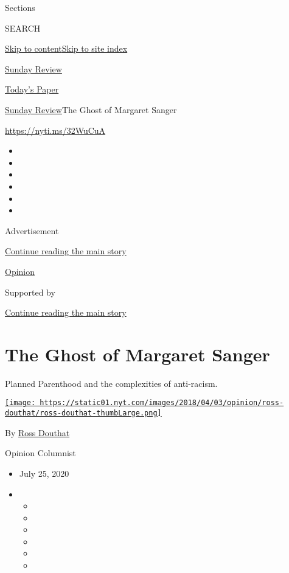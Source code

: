 Sections

SEARCH

\protect\hyperlink{site-content}{Skip to
content}\protect\hyperlink{site-index}{Skip to site index}

\href{https://www.nytimes.com/section/opinion/sunday}{Sunday Review}

\href{https://myaccount.nytimes.com/auth/login?response_type=cookie\&client_id=vi}{}

\href{https://www.nytimes.com/section/todayspaper}{Today's Paper}

\href{/section/opinion/sunday}{Sunday Review}\textbar{}The Ghost of
Margaret Sanger

\href{https://nyti.ms/32WuCuA}{https://nyti.ms/32WuCuA}

\begin{itemize}
\item
\item
\item
\item
\item
\item
\end{itemize}

Advertisement

\protect\hyperlink{after-top}{Continue reading the main story}

\href{/section/opinion}{Opinion}

Supported by

\protect\hyperlink{after-sponsor}{Continue reading the main story}

\hypertarget{the-ghost-of-margaret-sanger}{%
\section{The Ghost of Margaret
Sanger}\label{the-ghost-of-margaret-sanger}}

Planned Parenthood and the complexities of anti-racism.

\href{https://www.nytimes.com/by/ross-douthat}{\texttt{[image: https://static01.nyt.com/images/2018/04/03/opinion/ross-douthat/ross-douthat-thumbLarge.png]}}

By \href{https://www.nytimes.com/by/ross-douthat}{Ross Douthat}

Opinion Columnist

\begin{itemize}
\item
  July 25, 2020
\item
  \begin{itemize}
  \item
  \item
  \item
  \item
  \item
  \item
  \end{itemize}
\end{itemize}

